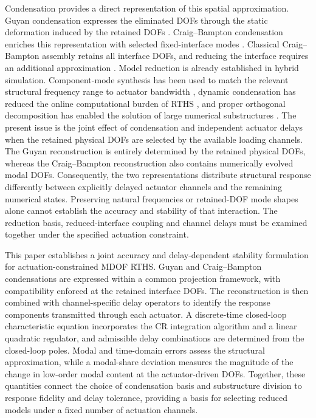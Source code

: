 \documentclass[a4paper,fleqn,review,12pt]{cas-sc}
\begin{document}
Condensation provides a direct representation of this spatial approximation. Guyan condensation expresses the eliminated DOFs through the static deformation induced by the retained DOFs \cite{Guyan1965}. Craig--Bampton condensation enriches this representation with selected fixed-interface modes \cite{Craig1968}. Classical Craig--Bampton assembly retains all interface DOFs, and reducing the interface requires an additional approximation \cite{Krattiger2019}. Model reduction is already established in hybrid simulation. Component-mode synthesis has been used to match the relevant structural frequency range to actuator bandwidth \cite{Miraglia2020}, dynamic condensation has reduced the online computational burden of RTHS \cite{Mucha2023}, and proper orthogonal decomposition has enabled the solution of large numerical substructures \cite{ZhangPOD2024}. The present issue is the joint effect of condensation and independent actuator delays when the retained physical DOFs are selected by the available loading channels. The Guyan reconstruction is entirely determined by the retained physical DOFs, whereas the Craig--Bampton reconstruction also contains numerically evolved modal DOFs. Consequently, the two representations distribute structural response differently between explicitly delayed actuator channels and the remaining numerical states. Preserving natural frequencies or retained-DOF mode shapes alone cannot establish the accuracy and stability of that interaction. The reduction basis, reduced-interface coupling and channel delays must be examined together under the specified actuation constraint.

This paper establishes a joint accuracy and delay-dependent stability formulation for actuation-constrained MDOF RTHS. Guyan and Craig--Bampton condensations are expressed within a common projection framework, with compatibility enforced at the retained interface DOFs. The reconstruction is then combined with channel-specific delay operators to identify the response components transmitted through each actuator. A discrete-time closed-loop characteristic equation incorporates the CR integration algorithm and a linear quadratic regulator, and admissible delay combinations are determined from the closed-loop poles. Modal and time-domain errors assess the structural approximation, while a modal-share deviation measures the magnitude of the change in low-order modal content at the actuator-driven DOFs. Together, these quantities connect the choice of condensation basis and substructure division to response fidelity and delay tolerance, providing a basis for selecting reduced models under a fixed number of actuation channels.
\end{document}
